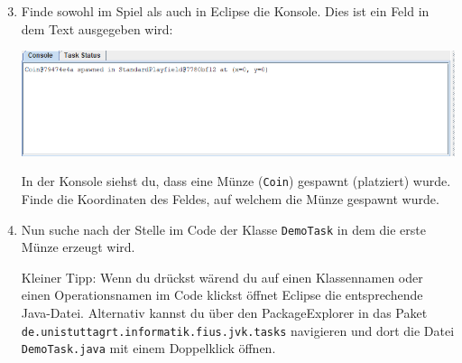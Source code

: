 \begin{enumerate}\setcounter{enumi}{2}

    \item Finde sowohl im Spiel als auch in Eclipse die Konsole. Dies ist ein Feld in dem Text ausgegeben wird:
    \begin{center}
        \includegraphics[width=\linewidth]{./figures/console.PNG}
    \end{center}

    In der Konsole siehst du, dass eine Münze (\texttt{Coin}) gespawnt (platziert) wurde. 
    Finde die Koordinaten des Feldes, auf welchem die Münze gespawnt wurde.

    \item Nun suche nach der Stelle im Code der Klasse \lstinline{DemoTask} in dem die erste Münze erzeugt wird.
    
        Kleiner Tipp: 
        Wenn du  drückst wärend du auf einen Klassennamen oder einen Operationsnamen im Code klickst öffnet Eclipse die entsprechende Java-Datei.
        Alternativ kannst du über den PackageExplorer in das Paket \texttt{de.unistuttagrt.informatik.fius.jvk.tasks} navigieren und dort die Datei \texttt{DemoTask.java} mit einem Doppelklick öffnen.
\end{enumerate}

